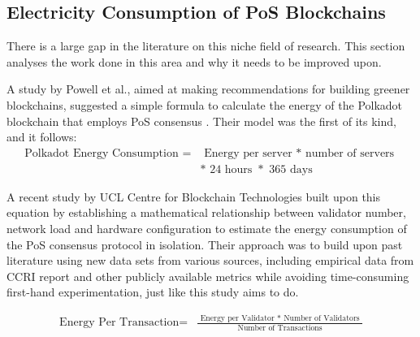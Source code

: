 \subsection{ Electricity Consumption of PoS Blockchains }
\label{LitRevExistingModels}

There is a large gap in the literature on this niche field of research. This section analyses the work done in this area and why it needs to be improved upon.

A study by Powell et al., aimed at making recommendations for building greener blockchains, suggested a simple formula to calculate the energy of the Polkadot blockchain that employs PoS consensus \cite{Powell2021AWARENESSBLOCKCHAIN}. Their model was the first of its kind, and it follows: 
\begin{align}
   \boldsymbol{\mathrm{\text{Polkadot Energy Consumption } = }}
   &\boldsymbol{\mathrm{\text{ Energy per server }* \text{ number of servers } } } \nonumber\\
   &\boldsymbol{\mathrm{* \text{ 24 hours } *\text{ 365 days }}} \nonumber
\end{align}

A recent study by UCL Centre for Blockchain Technologies \cite{PlattDiscussionProof-of-Work} built upon this equation by establishing a mathematical relationship between validator number, network load and hardware configuration to estimate the energy consumption of the PoS consensus protocol in isolation. Their approach was to build upon past literature using new data sets from various sources, including empirical data from CCRI report \cite{CryptoCarbonRatingsInstitute2022TheNetwork} and other publicly available metrics while avoiding time-consuming first-hand experimentation, just like this study aims to do. 

\begin{align}
   \boldsymbol{\mathrm{\text{Energy Per Transaction} = }}
   &\boldsymbol{\mathrm{\frac{\text{ Energy per Validator }* \text{ Number of Validators } }{\text{ Number of Transactions }}} } \nonumber\\ \nonumber
\end{align}

